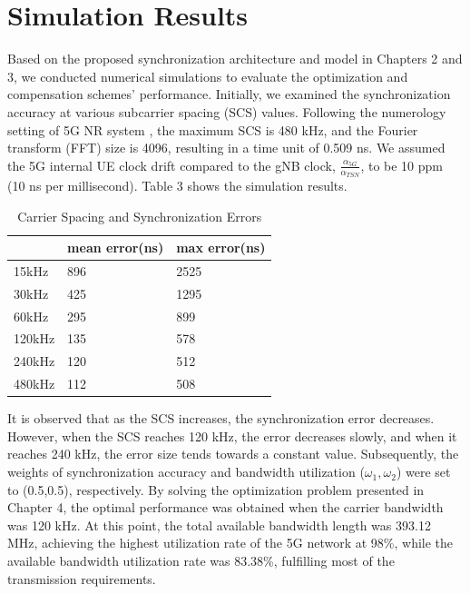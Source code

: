 \documentclass[english]{cccconf}
\begin{document}
\section{Simulation Results}
Based on the proposed synchronization architecture and model in Chapters 2 and 3, we conducted numerical simulations to evaluate the optimization and compensation schemes' performance. Initially, we examined the synchronization accuracy at various subcarrier spacing (SCS) values. Following the numerology setting of 5G NR system \cite{access2015requirements}, the maximum SCS is 480 kHz, and the Fourier transform (FFT) size is 4096, resulting in a time unit of 0.509 ns. We assumed the 5G internal UE clock drift compared to the gNB clock, $\frac{\alpha_{5G}}{\alpha_{TSN}}$, to be 10 ppm (10 ns per millisecond). Table 3 shows the simulation results.

\begin{table}[!htb]
	\centering
	\caption{Carrier Spacing and Synchronization Errors}
	\label{tab1}
	\begin{tabular}{l|l|l}
		\hline
		 & \textbf{mean error(ns)}& \textbf{max error(ns)} \\
		\hline
		15kHz 
		& 896
		& 2525 \\
		\hline
		30kHz
		& 425
		& 1295 \\
		\hline
		60kHz
		& 295
		& 899 \\
		\hline
		120kHz
		& 135
		& 578 \\
		\hline
		240kHz
		& 120
		& 512 \\
		\hline
			480kHz
		& 112
		& 508 \\
		\hline
	\end{tabular}
\end{table}


It is observed that as the SCS increases, the synchronization error decreases. However, when the SCS reaches 120 kHz, the error decreases slowly, and when it reaches 240 kHz, the error size tends towards a constant value. Subsequently, the weights of synchronization accuracy and bandwidth utilization ($\omega_1,\omega_2$) were set to (0.5,0.5), respectively. By solving the optimization problem presented in Chapter 4, the optimal performance was obtained when the carrier bandwidth was 120 kHz. At this point, the total available bandwidth length was 393.12 MHz, achieving the highest utilization rate of the 5G network at 98\%, while the available bandwidth utilization rate was 83.38\%, fulfilling most of the transmission requirements.
\end{document}

